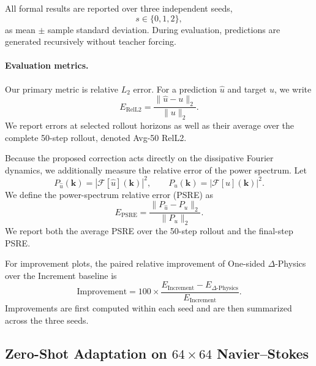 \documentclass[10pt,twocolumn]{article}
\begin{document}
All formal results are reported over three independent seeds,
\begin{equation}
    s\in\{0,1,2\},
\end{equation}
as mean $\pm$ sample standard deviation. During evaluation, predictions are
generated recursively without teacher forcing.

\paragraph{Evaluation metrics.}
Our primary metric is relative $L_2$ error. For a prediction
$\widehat{u}$ and target $u$, we write
\begin{equation}
    E_{\mathrm{RelL2}}
    =
    \frac{\|\widehat{u}-u\|_2}
         {\|u\|_2}.
    \label{eq:rell2_metric}
\end{equation}
We report errors at selected rollout horizons as well as their average over
the complete 50-step rollout, denoted Avg-50 RelL2.

Because the proposed correction acts directly on the dissipative Fourier
dynamics, we additionally measure the relative error of the power spectrum.
Let
\begin{equation}
    P_{\widehat{u}}(\mathbf{k})
    =
    |\mathcal{F}[\widehat{u}](\mathbf{k})|^2,
    \qquad
    P_u(\mathbf{k})
    =
    |\mathcal{F}[u](\mathbf{k})|^2.
\end{equation}
We define the power-spectrum relative error (PSRE) as
\begin{equation}
    E_{\mathrm{PSRE}}
    =
    \frac{
        \|P_{\widehat{u}}-P_u\|_2
    }{
        \|P_u\|_2
    }.
    \label{eq:psre_metric}
\end{equation}
We report both the average PSRE over the 50-step rollout and the final-step
PSRE.

For improvement plots, the paired relative improvement of
One-sided $\Delta$-Physics over the Increment baseline is
\begin{equation}
    \mathrm{Improvement}
    =
    100
    \times
    \frac{
        E_{\mathrm{Increment}}
        -
        E_{\Delta\text{-Physics}}
    }{
        E_{\mathrm{Increment}}
    }.
    \label{eq:improvement_metric}
\end{equation}
Improvements are first computed within each seed and are then summarized
across the three seeds.

\subsection{Zero-Shot Adaptation on
\texorpdfstring{$64\times64$}{64x64} Navier--Stokes}
\label{sec:ns_results}
\end{document}
